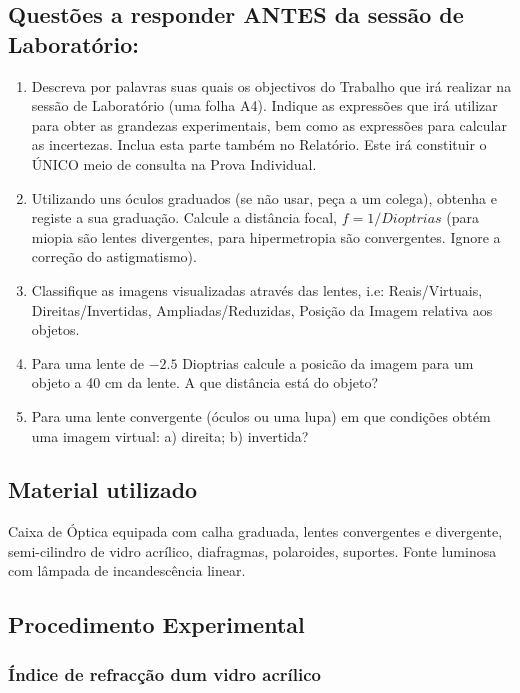 \documentclass[a4paper,12pt]{article}      %
\begin{document}
\subsection{\sf Questões a responder ANTES da sessão de Laboratório:}
\begin{enumerate}
\item Descreva por palavras suas quais os objectivos do Trabalho que irá realizar na sessão de Laboratório (uma folha A4). Indique as expressões que irá utilizar para obter as grandezas experimentais, bem como as expressões para calcular as incertezas. Inclua esta parte também no Relatório. Este irá constituir o ÚNICO meio de consulta na Prova Individual.
	
\item Utilizando uns óculos graduados (se não usar, peça a um colega), obtenha e registe a sua graduação. Calcule a distância focal, $f=1/Dioptrias$ (para miopia são lentes divergentes, para hipermetropia são convergentes. Ignore  a correção do astigmatismo).
\item Classifique as imagens visualizadas através das lentes, i.e: Reais/Virtuais, Direitas/Invertidas, Ampliadas/Reduzidas, Posição da Imagem relativa aos objetos.
\item Para uma lente de $-2.5$ Dioptrias calcule a posicão da imagem para um objeto a 40 cm da lente. A que distância está do objeto?
\item Para uma lente convergente (óculos ou uma lupa) em que condições obtém uma imagem virtual: a) direita; b) invertida?
\end{enumerate}

\subsection{\sf Material utilizado}
Caixa de Óptica equipada com calha graduada, lentes convergentes e divergente, semi-cilindro de 
vidro acrílico, diafragmas, polaroides, suportes. 
Fonte luminosa com lâmpada de incandescência linear. 

\subsection{\sf Procedimento Experimental}

\subsubsection{\sf  Índice de refracção dum vidro acrílico }
\end{document}
